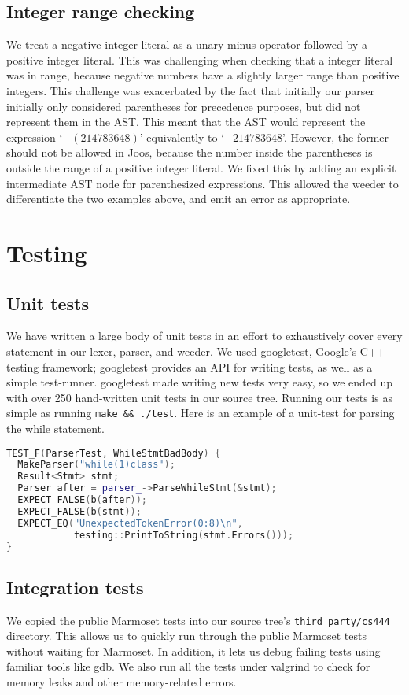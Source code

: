 \documentclass[12pt, titlepage]{article}
\begin{document}
\subsection{Integer range checking}
We treat a negative integer literal as a unary minus operator followed by a
positive integer literal. This was challenging when checking that a integer
literal was in range, because negative numbers have a slightly larger range
than positive integers. This challenge was exacerbated by the fact that
initially our parser initially only considered parentheses for precedence
purposes, but did not represent them in the AST. This meant that the AST would
represent the expression `$-(214783648)$' equivalently to `$-214783648$'.
However, the former should not be allowed in Joos, because the number inside
the parentheses is outside the range of a positive integer literal. We fixed
this by adding an explicit intermediate AST node for parenthesized expressions.
This allowed the weeder to differentiate the two examples above, and emit an
error as appropriate.

\newpage

\section{Testing}
\subsection{Unit tests}
We have written a large body of unit tests in an effort to exhaustively cover
every statement in our lexer, parser, and weeder. We used googletest, Google's
C++ testing framework; googletest provides an API for writing tests, as well as
a simple test-runner. googletest made writing new tests very easy, so we ended
up with over 250 hand-written unit tests in our source tree. Running our tests
is as simple as running \verb+make && ./test+. Here is an example of a
unit-test for parsing the while statement.

\begin{lstlisting}[language=c++]
TEST_F(ParserTest, WhileStmtBadBody) {
  MakeParser("while(1)class");
  Result<Stmt> stmt;
  Parser after = parser_->ParseWhileStmt(&stmt);
  EXPECT_FALSE(b(after));
  EXPECT_FALSE(b(stmt));
  EXPECT_EQ("UnexpectedTokenError(0:8)\n",
            testing::PrintToString(stmt.Errors()));
}
\end{lstlisting}

\subsection{Integration tests}
We copied the public Marmoset tests into our source tree's
\verb+third_party/cs444+ directory. This allows us to quickly run through the
public Marmoset tests without waiting for Marmoset. In addition, it lets us
debug failing tests using familiar tools like gdb. We also run all the tests
under valgrind to check for memory leaks and other memory-related errors.
\end{document}
